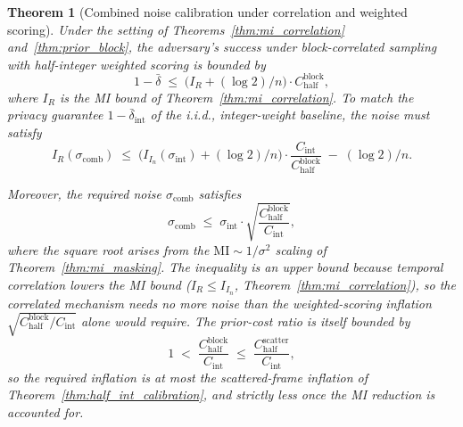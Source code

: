\documentclass[letterpaper]{article} %
\newtheorem{theorem}{Theorem}
\begin{document}
\begin{theorem}[Combined noise calibration under correlation and weighted scoring]
\label{thm:combined_calibration}
Under the setting of Theorems~\ref{thm:mi_correlation}
and~\ref{thm:prior_block}, the adversary's success under
block-correlated sampling with half-integer weighted scoring is
bounded by
\begin{equation}
\label{eq:combined_bound}
1 - \bar\delta
\;\le\;
\bigl(I_R + (\log 2)/n\bigr) \cdot C^{\mathrm{block}}_{\mathrm{half}},
\end{equation}
where $I_R$ is the MI bound of Theorem~\ref{thm:mi_correlation}.
To match the privacy guarantee $1 - \bar\delta_{\mathrm{int}}$
of the i.i.d., integer-weight baseline, the noise must satisfy
\begin{equation}
\label{eq:combined_calibration}
I_R(\sigma_{\mathrm{comb}})
\;\le\;
\bigl(I_{I_n}(\sigma_{\mathrm{int}}) + (\log 2)/n\bigr)
\cdot \frac{C_{\mathrm{int}}}{C^{\mathrm{block}}_{\mathrm{half}}}
\;-\; (\log 2)/n.
\end{equation}

Moreover, the required noise $\sigma_{\mathrm{comb}}$ satisfies
\begin{equation}
\label{eq:sigma_combined_bound}
\sigma_{\mathrm{comb}}
\;\le\;
\sigma_{\mathrm{int}}
\cdot \sqrt{\frac{C^{\mathrm{block}}_{\mathrm{half}}}{C_{\mathrm{int}}}},
\end{equation}
where the square root arises from the $\mathrm{MI} \sim 1/\sigma^2$
scaling of Theorem~\ref{thm:mi_masking}.  The inequality is an
\emph{upper} bound because temporal correlation lowers the MI bound
($I_R \le I_{I_n}$, Theorem~\ref{thm:mi_correlation}), so the correlated
mechanism needs no more noise than the weighted-scoring inflation
$\sqrt{C^{\mathrm{block}}_{\mathrm{half}}/C_{\mathrm{int}}}$ alone would
require. The prior-cost ratio is itself bounded by
\[
1
\;<\;
\frac{C^{\mathrm{block}}_{\mathrm{half}}}{C_{\mathrm{int}}}
\;\le\;
\frac{C^{\mathrm{scatter}}_{\mathrm{half}}}{C_{\mathrm{int}}},
\]
so the required inflation is at most the scattered-frame inflation of
Theorem~\ref{thm:half_int_calibration}, and strictly less once the MI
reduction is accounted for.
\end{theorem}
\end{document}
